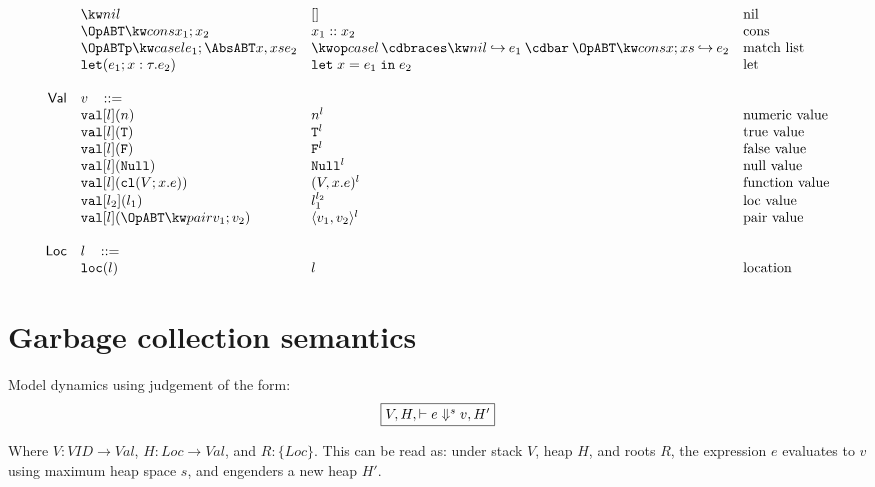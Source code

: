 \documentclass[11pt]{article}
\newcommand{\ms}[1]{\ensuremath{\mathsf{#1}}}
\newcommand{\irl}[1]{\mathtt{#1}}
\begin{document}
\[\begin{array}{r l l l l}
 	& \nilexabt					& []   										& \text{nil}\\
 	& \consexabt{x_1}{x_2}					& x_1::x_2   										& \text{cons}\\
 	& \listcaseexabt{l}{e_1}{x}{xs}{e_2}					& \listcaseexcst{l}{e_1}{x}{xs}{e_2}   	& \text{match list}\\
  & \irl{let}(e_1; x : \tau.e_2)			& \irl{let}\; x = e_1 \; \irl{in}\; e_2   	& \text{let}\\
  \\
\ms{Val}
        & v   \,\,\,\,\, ::= \\
 	& \irl{val}[l](n)                                			& n^l 												& \text{numeric value}\\
 	& \irl{val}[l](\irl{T})                               			& \irl{T}^l 								  & \text{true value}\\
 	& \irl{val}[l](\irl{F})                                			& \irl{F}^l								  & \text{false value}\\
 	& \irl{val}[l](\irl{Null})                                  & \irl{Null}^l 								  & \text{null value}\\
 	& \irl{val}[l](\irl{cl}(V; x.e))                & (V, x.e)^l 					& \text{function value}\\
 	& \irl{val}[l_2](l_1)                                			& l_1^{l_2} 								  & \text{loc value}\\
 	& \irl{val}[l](\pairexabt{v_1}{v_2})                             & \pairexcst{v_1}{v_2}^l 								  & \text{pair value}\\
  \\
\ms{Loc}
        & l   \,\,\,\,\, ::= \\
 	& \irl{loc}(l)                                			& l 												& \text{location}\\
\end{array}
\]

\section{Garbage collection semantics}

Model dynamics using judgement of the form:
\[
\fbox{$V,H, \vdash e \Downarrow^s v, H'$}
\]

Where $V : VID \to Val$, $H : Loc \to Val$, and $R : \{Loc\}$. This can be read as: under stack $V$, heap $H$, and roots $R$,
the expression $e$ evaluates to $v$ using maximum heap space $s$, and engenders a new heap $H'$.\\
\end{document}
